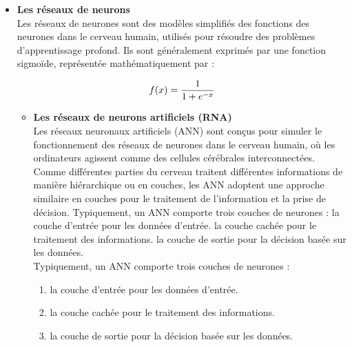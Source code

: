 \documentclass{report}
\begin{document}
\begin{itemize}
\item { \large \textbf{Les réseaux de neurons}} \\

Les réseaux de neurones sont des modèles simplifiés des fonctions des neurones dans le cerveau humain, utilisés pour résoudre des problèmes d'apprentissage profond. Ils sont généralement exprimés par une fonction sigmoïde, représentée mathématiquement par :

\[
\centering
f(x) = \frac{1}{1 + e^{-x}}
\]
\begin{itemize}
 \item \textbf{Les réseaux de neurons artificiels (RNA)} \\
Les réseaux neuronaux artificiels (ANN) sont conçus pour simuler le fonctionnement des réseaux de neurones dans le cerveau humain, où les ordinateurs agissent comme des cellules cérébrales interconnectées. Comme différentes parties du cerveau traitent différentes informations de manière hiérarchique ou en couches, les ANN adoptent une approche similaire en couches pour le traitement de l'information et la prise de décision. 
Typiquement, un ANN comporte trois couches de neurones : 
la couche d'entrée pour les données d'entrée.
 la couche cachée pour le traitement des informations.
la couche de sortie pour la décision basée sur les données.
\cite{Tehseen Mazhar and al ,2023} \\
Typiquement, un ANN comporte trois couches de neurones : 

\begin{enumerate}
\item la couche d'entrée pour les données d'entrée.
\item la couche cachée pour le traitement des informations.
\item la couche de sortie pour la décision basée sur les données. \cite{Tehseen Mazhar and al ,2023}
\end{enumerate} 


\end{itemize}
\end{itemize}
\end{document}
